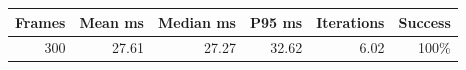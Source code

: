 \begin{tabular}{rrrrrr}
\toprule
Frames & Mean ms & Median ms & P95 ms & Iterations & Success \\
\midrule
300 & 27.61 & 27.27 & 32.62 & 6.02 & 100\% \\
\bottomrule
\end{tabular}
